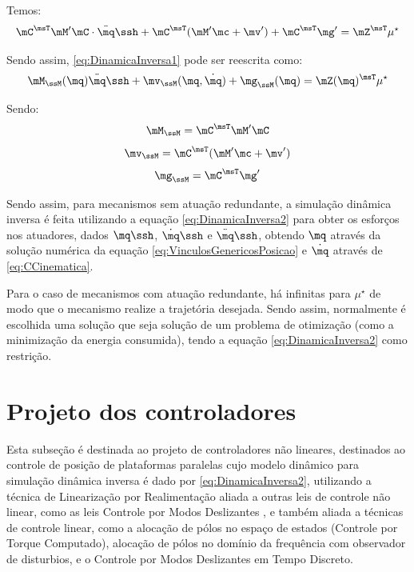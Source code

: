 \documentclass[]{politex}
\begin{document}
Temos:
\begin{equation} \label{eq:DinamicaInversa1}
\mC^\msT \mM' \mC \cdot \ddot{\mq}\ssh + \mC^\msT (   \mM' \mc + \mv' ) + \mC^\msT \mg'  = \mZ^\msT \mu^\star
\end{equation}

Sendo assim, \eqref{eq:DinamicaInversa1} pode ser reescrita como:
\begin{equation} \label{eq:DinamicaInversa2}
\mM_{\ssM} (\mq) \ddot{\mq}\ssh + \mv_{\ssM}(\mq, \dot{\mq}) + \mg_{\ssM}(\mq)   = \mZ(\mq)^{\msT} \mu^\star
\end{equation}

Sendo: 
\begin{equation}
\mM_{\ssM}  =  \mC^\msT \mM' \mC
\end{equation}
\begin{equation}
\mv_{\ssM}  =  \mC^\msT (  \mM'  \mc  + \mv' )
\end{equation}
\begin{equation}
\mg_{\ssM}  = \mC^\msT \mg'
\end{equation}

Sendo assim, para mecanismos sem atuação redundante, a simulação dinâmica inversa é feita utilizando a equação \eqref{eq:DinamicaInversa2} para obter os esforços nos atuadores, dados $\mq\ssh$, $\dot{\mq}\ssh$ e $\ddot{\mq}\ssh$, obtendo $\mq$ através da solução numérica da equação \eqref{eq:VinculosGenericosPosicao} e $\dot{\mq}$ através de \eqref{eq:CCinematica}. 

Para o caso de mecanismos com atuação redundante, há infinitas para $\mu^\star$ de modo que o mecanismo realize a trajetória desejada. Sendo assim, normalmente é escolhida uma solução que seja solução de um problema de otimização (como a minimização da energia consumida), tendo a equação \eqref{eq:DinamicaInversa2} como restrição.


\chapter{Projeto dos controladores}

Esta subseção é destinada ao projeto de controladores não lineares, destinados ao controle de posição de plataformas paralelas cujo modelo dinâmico para simulação dinâmica inversa é dado por \eqref{eq:DinamicaInversa2}, utilizando a técnica de Linearização por Realimentação aliada a outras leis de controle não linear, como as leis Controle por Modos Deslizantes \cite{Slotini, Utkin}, e também aliada a técnicas de controle linear, como a alocação de pólos no espaço de estados (Controle por Torque Computado), alocação de pólos no domínio da frequência com observador de disturbios, e o Controle por Modos Deslizantes em Tempo Discreto.
\end{document}
